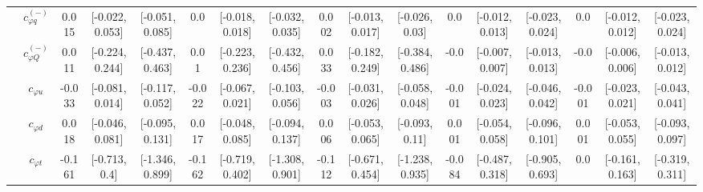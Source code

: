 \documentclass{article}
\begin{document}
\begin{table}[H]
\begin{tabular}{|c|c|c|c|c|c|c|c|c|c|c|c|c|c|c|c|c|}
 & $c_{\varphi q}^{(-)}$ & 0.015                             & [-0.022,0.053]                                 & [-0.051,0.085] & 0.0                             & [-0.018,0.018]                                 & [-0.032,0.035] & 0.002                             & [-0.013,0.017]                                 & [-0.026,0.03] & 0.0                             & [-0.012,0.013]                                 & [-0.023,0.024] & 0.0                             & [-0.012,0.012]                                 & [-0.023,0.024] \\ \cline{2-17}
 & $c_{\varphi Q}^{(-)}$ & 0.011                             & [-0.224,0.244]                                 & [-0.437,0.463] & 0.01                             & [-0.223,0.236]                                 & [-0.432,0.456] & 0.033                             & [-0.182,0.249]                                 & [-0.384,0.486] & -0.0                             & [-0.007,0.007]                                 & [-0.013,0.013] & -0.0                             & [-0.006,0.006]                                 & [-0.013,0.012] \\ \cline{2-17}
 & $c_{\varphi u}$ & -0.033                             & [-0.081,0.014]                                 & [-0.117,0.052] & -0.022                             & [-0.067,0.021]                                 & [-0.103,0.056] & -0.003                             & [-0.031,0.026]                                 & [-0.058,0.048] & -0.001                             & [-0.024,0.023]                                 & [-0.046,0.042] & -0.001                             & [-0.023,0.021]                                 & [-0.043,0.041] \\ \cline{2-17}
 & $c_{\varphi d}$ & 0.018                             & [-0.046,0.081]                                 & [-0.095,0.131] & 0.017                             & [-0.048,0.085]                                 & [-0.094,0.137] & 0.006                             & [-0.053,0.065]                                 & [-0.093,0.11] & 0.001                             & [-0.054,0.058]                                 & [-0.096,0.101] & 0.001                             & [-0.053,0.055]                                 & [-0.093,0.097] \\ \cline{2-17}
 & $c_{\varphi t}$ & -0.161                             & [-0.713,0.4]                                 & [-1.346,0.899] & -0.162                             & [-0.719,0.402]                                 & [-1.308,0.901] & -0.112                             & [-0.671,0.454]                                 & [-1.238,0.935] & -0.084                             & [-0.487,0.318]                                 & [-0.905,0.693] & 0.0                             & [-0.161,0.163]                                 & [-0.319,0.311] \\ \cline{2-17}

\end{tabular}
\end{table}
\end{document}

